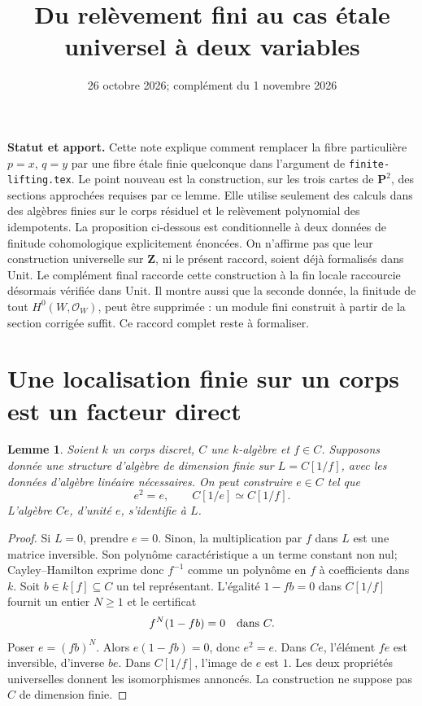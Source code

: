 \documentclass[11pt]{amsart}
\title{Du relèvement fini au cas étale universel à deux variables}
\date{26 octobre 2026; complément du 1 novembre 2026}
\newtheorem{lemma}{Lemme}
\newcommand{\OO}{\mathcal O}
\begin{document}
\maketitle

\noindent\textbf{Statut et apport.}
Cette note explique comment remplacer la fibre particulière
$p=x$, $q=y$ par une fibre étale finie quelconque dans l'argument
de \texttt{finite-lifting.tex}. Le point nouveau est la construction,
sur les trois cartes de $\mathbf P^2$, des sections approchées requises
par ce lemme. Elle utilise seulement des calculs dans des algèbres
finies sur le corps résiduel et le relèvement polynomial des idempotents.
La proposition ci-dessous est conditionnelle à deux données de finitude
cohomologique explicitement énoncées. On n'affirme pas que leur
construction universelle sur $\mathbf Z$, ni le présent raccord,
soient déjà formalisés dans Unit. Le complément final raccorde cette
construction à la fin locale raccourcie désormais vérifiée dans Unit.
Il montre aussi que la seconde donnée, la finitude de tout
$H^0(W,\OO_W)$, peut être supprimée : un module fini construit à partir
de la section corrigée suffit. Ce raccord complet reste à formaliser.

\section{Une localisation finie sur un corps est un facteur direct}

\begin{lemma}\label{factor}
Soient $k$ un corps discret, $C$ une $k$-algèbre et $f\in C$.
Supposons donnée une structure d'algèbre de dimension finie sur
$L=C[1/f]$, avec les données d'algèbre linéaire nécessaires.
On peut construire $e\in C$ tel que
\[
 e^2=e,\qquad C[1/e]\simeq C[1/f].
\]
L'algèbre $Ce$, d'unité $e$, s'identifie à $L$.
\end{lemma}
\begin{proof}
Si $L=0$, prendre $e=0$. Sinon, la multiplication par $f$ dans $L$
est une matrice inversible. Son polynôme caractéristique a un terme
constant non nul; Cayley--Hamilton exprime donc $f^{-1}$ comme un
polynôme en $f$ à coefficients dans $k$. Soit $b\in k[f]\subseteq C$
un tel représentant. L'égalité $1-fb=0$ dans $C[1/f]$ fournit un
entier $N\geq1$ et le certificat
\[
 f^N(1-fb)=0\quad\hbox{dans }C.
\]
Poser $e=(fb)^N$. Alors $e(1-fb)=0$, donc $e^2=e$.
Dans $Ce$, l'élément $fe$ est inversible, d'inverse $be$.
Dans $C[1/f]$, l'image de $e$ est $1$.
Les deux propriétés universelles donnent les isomorphismes annoncés.
La construction ne suppose pas $C$ de dimension finie.
\end{proof}
\end{document}
